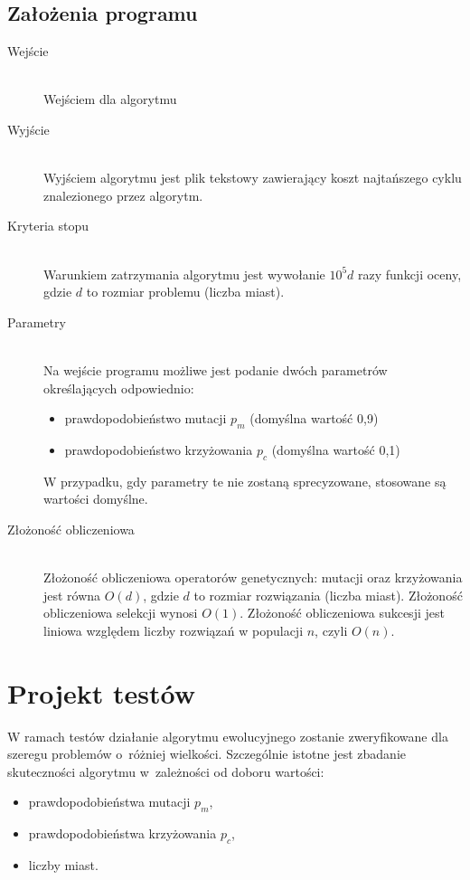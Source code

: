 \documentclass[12pt, a4paper]{article}
\begin{document}
\subsection{Założenia programu}
\begin{description}
	\item[Wejście] \hfill \\
Wejściem dla algorytmu %
	\item[Wyjście] \hfill \\
	Wyjściem algorytmu jest plik tekstowy zawierający koszt najtańszego cyklu znalezionego przez algorytm.
	\item[Kryteria stopu] \hfill \\
	Warunkiem zatrzymania algorytmu jest wywołanie $10^5d$ razy funkcji oceny, gdzie $d$ to rozmiar problemu (liczba miast).
	\item[Parametry] \hfill \\
	Na wejście programu możliwe jest podanie dwóch parametrów określających odpowiednio:
		\begin{itemize}
			\item prawdopodobieństwo mutacji $p_m$ (domyślna wartość 0,9)
			\item prawdopodobieństwo krzyżowania $p_c$ (domyślna wartość 0,1)
		\end{itemize}
		W przypadku, gdy parametry te nie zostaną sprecyzowane, stosowane są wartości domyślne.
	\item[Złożoność obliczeniowa] \hfill \\
	Złożoność obliczeniowa operatorów genetycznych: mutacji oraz krzyżowania jest równa $O(d)$, 
gdzie $d$ to rozmiar rozwiązania (liczba miast). Złożoność obliczeniowa selekcji wynosi $O(1)$. Złożoność obliczeniowa
sukcesji jest liniowa względem liczby rozwiązań w populacji $n$, czyli $O(n)$.

\end{description}

\section{Projekt testów}
W ramach testów działanie algorytmu ewolucyjnego zostanie zweryfikowane dla szeregu problemów o~różniej wielkości. Szczególnie istotne jest zbadanie skuteczności algorytmu w~zależności od doboru wartości:
\begin{itemize}
	\item prawdopodobieństwa mutacji $p_m$,
	\item prawdopodobieństwa krzyżowania $p_c$,
	\item liczby miast.
\end{itemize}
\end{document}
